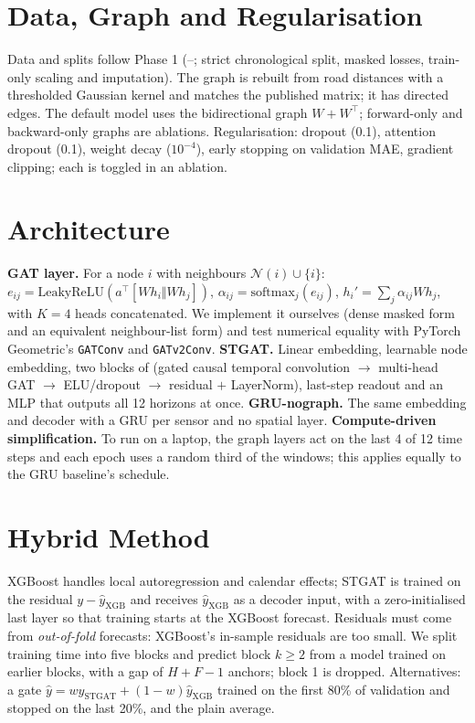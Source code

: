 \documentclass[conference]{IEEEtran}
\begin{document}
\section{Data, Graph and Regularisation}
Data and splits follow Phase 1 (\splitTrainStart--\splitTestEnd{}; strict chronological split, masked losses, train-only scaling and imputation).
The graph is rebuilt from road distances with a thresholded Gaussian kernel and matches the published matrix; it has \graphEdges{} directed edges.
The default model uses the bidirectional graph $W+W^\top$; forward-only and backward-only graphs are ablations.
Regularisation: dropout (0.1), attention dropout (0.1), weight decay ($10^{-4}$), early stopping on validation MAE, gradient clipping; each is toggled in an ablation.

\section{Architecture}
\textbf{GAT layer.} For a node $i$ with neighbours $\mathcal N(i)\cup\{i\}$: $e_{ij}=\mathrm{LeakyReLU}(a^\top[Wh_i\Vert Wh_j])$, $\alpha_{ij}=\mathrm{softmax}_j(e_{ij})$, $h_i'=\sum_j\alpha_{ij}Wh_j$, with $K=4$ heads concatenated.
We implement it ourselves (dense masked form and an equivalent neighbour-list form) and test numerical equality with PyTorch Geometric's \texttt{GATConv} and \texttt{GATv2Conv}.
\textbf{STGAT.} Linear embedding, learnable node embedding, two blocks of (gated causal temporal convolution $\to$ multi-head GAT $\to$ ELU/dropout $\to$ residual $+$ LayerNorm), last-step readout and an MLP that outputs all 12 horizons at once.
\textbf{GRU-nograph.} The same embedding and decoder with a GRU per sensor and no spatial layer.
\textbf{Compute-driven simplification.} To run on a laptop, the graph layers act on the last 4 of 12 time steps and each epoch uses a random third of the windows; this applies equally to the GRU baseline's schedule.

\section{Hybrid Method}
XGBoost handles local autoregression and calendar effects; STGAT is trained on the residual $y-\hat y_{\mathrm{XGB}}$ and receives $\hat y_{\mathrm{XGB}}$ as a decoder input, with a zero-initialised last layer so that training starts at the XGBoost forecast.
Residuals must come from \emph{out-of-fold} forecasts: XGBoost's in-sample residuals are too small.
We split training time into five blocks and predict block $k\ge2$ from a model trained on earlier blocks, with a gap of $H+F-1$ anchors; block 1 is dropped.
Alternatives: a gate $\hat y=w\hat y_{\mathrm{STGAT}}+(1-w)\hat y_{\mathrm{XGB}}$ trained on the first 80\% of validation and stopped on the last 20\%, and the plain average.
\end{document}

